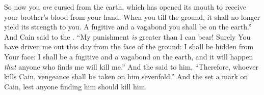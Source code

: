 \bverse So now you \textit{are} cursed from the earth, which has opened its mouth to receive your brother's blood from your hand.
\bverse When you till the ground, it shall no longer yield its strength to you. A fugitive and a vagabond you shall be on the earth.''
\bverse And Cain said to the \lord. ``My punishment \textit{is} greater than I can bear!
\bverse Surely You have driven me out this day from the face of the ground: I shall be hidden from Your face: I shall be a fugitive and a vagabond on the earth, and it will happen \textit{that} anyone who finds me will kill me.''
\bverse And the \lord said to him, ``Therefore, whoever kills Cain, vengeance shall be taken on him sevenfold.'' And the \lord set a mark on Cain, lest anyone finding him should kill him.
\bverse 
\bverse 
\bverse 
\bverse 
\bverse 
\bverse 
\bverse 
\bverse 
\bverse 
\bverse 
\bverse 
